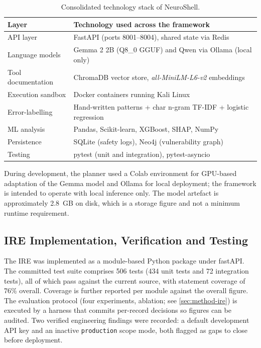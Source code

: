 \begin{table}[htbp]
  \centering
  \begin{tabular}{@{}p{}p{}@{}}
    \toprule
    \textbf{Layer} & \textbf{Technology used across the framework}\\
    \midrule
    API layer & FastAPI (ports 8001--8004), shared state via Redis\\
    Language models & Gemma 2 2B (Q8\_0 GGUF) and Qwen via Ollama (local only)\\
    Tool documentation & ChromaDB vector store, \emph{all-MiniLM-L6-v2} embeddings\\
    Execution sandbox & Docker containers running Kali Linux\\
    Error-labelling & Hand-written patterns + char n-gram TF-IDF + logistic regression\\
    ML analysis & Pandas, Scikit-learn, XGBoost, SHAP, NumPy\\
    Persistence & SQLite (safety logs), Neo4j (vulnerability graph)\\
    Testing & pytest (unit and integration), pytest-asyncio\\
    \bottomrule
  \end{tabular}
  \caption{Consolidated technology stack of NeuroShell.}\label{tab:stack}
\end{table}

During development, the planner used a Colab environment for GPU-based
adaptation of the Gemma model and Ollama for local deployment; the framework is
intended to operate with local inference only. The model artefact is
approximately 2.8~GB on disk, which is a storage figure and not a minimum
runtime requirement.

\subsection{IRE Implementation, Verification and Testing}\label{sec:testing-ire}

The IRE was implemented as a module-based Python package under fastAPI. The
committed test suite comprises 506 tests (434 unit tests and 72 integration
tests), all of which pass against the current source, with statement coverage of
76\% overall. Coverage is further reported per module against the overall
figure. The evaluation protocol (four experiments, ablation; see
\cref{sec:method-ire}) is executed by a harness that commits per-record
decisions so figures can be audited. Two verified engineering findings were
recorded: a default development API key and an inactive \texttt{production}
scope mode, both flagged as gaps to close before deployment.


